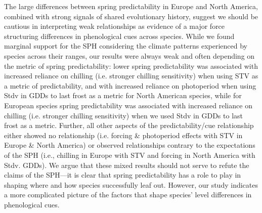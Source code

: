 \documentclass[12pt]{article}
\begin{document}
The large differences between spring predictability in Europe and North America, combined with strong signals of shared evolutionary history, suggest we should be cautious in interpreting weak relationships as evidence of a major force structuring differences in phenological cues across species. While we found marginal support for the SPH considering the climate patterns experienced by species across their ranges, our results were always weak and often depending on the metric of spring predictability: lower spring predictability was associated with increased reliance on chilling (i.e. stronger chilling sensitivity) when using STV as a metric of predictability, and with increased reliance on photoperiod when using Stdv in GDDs to last frost as a metric for North American species, while for European species spring predictability was associated with increased reliance on chilling (i.e. stronger chilling sensitivity) when we used Stdv in GDDs to last frost as a metric. Further, all other aspects of the predictability/cue relationship either showed no relationship (i.e. forcing \& photoperiod effects with STV in Europe \& North America) or observed relationships contrary to the expectations of the SPH (i.e., chilling in Europe with STV and forcing in North America with Stdv. GDDs). We argue that these mixed results should not serve to refute the claims of the SPH---it is clear that spring predictability has a role to play in shaping where and how species successfully leaf out. However, our study indicates a more complicated picture of the factors that shape species' level differences in phenological cues. %

\end{document}
